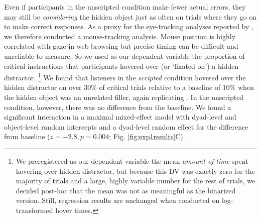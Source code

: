 \documentclass[manuscript]{stjour}
\begin{document}

Even if participants in the unscripted condition make fewer actual errors, they may still be \emph{considering} the hidden object just as often on trials where they go on to make correct responses. As a proxy for the eye-tracking analyses reported by \cite{KeysarLinBarr03_LimitsOnTheoryOfMindUse}, we therefore conducted a mouse-tracking analysis. Mouse position is highly correlated with gaze in web browsing \citep{ChenEtAl01_MouseCursor, SpiveyGrosjeanKnoblich05,RoddenEtAl08_EyeMouseCoordinationWebSearch} but precise timing can be difficult and unreliable to measure. 
So we used as our dependent variable the proportion of critical instructions that participants hovered over (or `fixated on') a hidden distractor.
\footnote{We preregistered as our dependent variable the mean \emph{amount of time} spent hovering over hidden distractor, but because this DV was exactly zero for the majority of trials and a large, highly variable number for the rest of trials, we decided post-hoc that the mean was not as meaningful as the binarized version. Still, regression results are unchanged when conducted on log-transformed hover times.} 
We found that listeners in the \emph{scripted} condition hovered over the hidden distractor on over 30\% of critical trials relative to a baseline of 10\% when the hidden object was an unrelated filler, again replicating \cite{KeysarLinBarr03_LimitsOnTheoryOfMindUse}. In the unscripted condition, however, there was no difference from the baseline. We found a significant interaction in a maximal mixed-effect model with dyad-level and object-level random intercepts and a dyad-level random effect for the difference from baseline ($z = -2.8, p = 0.004$; Fig. \ref{fig:exp1results}C). %
\end{document}
